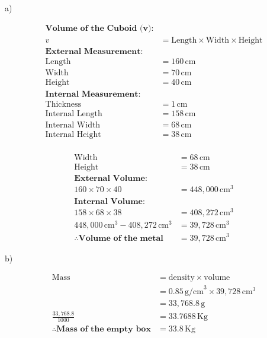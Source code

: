 \documentclass[
  a4paperpaper,
]{scrbook}
\begin{document}
\begin{tcolorbox}[enhanced jigsaw, left=2mm, colframe=quarto-callout-caution-color-frame, toptitle=1mm, opacitybacktitle=0.6, rightrule=.15mm, colbacktitle=quarto-callout-caution-color!10!white, colback=white, arc=.35mm, breakable, leftrule=.75mm, bottomtitle=1mm, bottomrule=.15mm, title=\textcolor{quarto-callout-caution-color}{\faFire}\hspace{0.5em}{Solution}, titlerule=0mm, coltitle=black, toprule=.15mm, opacityback=0]

a)

$$
\begin{aligned}
\textbf{Volume of the Cuboid (v):} & \\
v &= \text{Length} \times \text{Width} \times \text{Height} \\
\textbf{External Measurement:} & \\
\text{Length} &= 160 \, \text{cm} \\
\text{Width} &= 70 \, \text{cm} \\
\text{Height} &= 40 \, \text{cm} \\
\textbf{Internal Measurement:} & \\
\text{Thickness} &= 1 \, \text{cm} \\
\text{Internal Length} &= 158 \, \text{cm} \\
\text{Internal Width} &= 68 \, \text{cm} \\
\text{Internal Height} &= 38 \, \text{cm} \\ 
\end{aligned}
$$

\[
\begin{aligned}
\text{Width} &= 68 \, \text{cm} \\
\text{Height} &= 38 \, \text{cm} \\ 
\textbf{External Volume:} \\
160 \times 70 \times 40 &= 448,000 \, \text{cm}^3 \\ 
\textbf{Internal Volume:} \\
158 \times 68 \times 38 &= 408,272 \, \text{cm}^3 \\ 
448,000 \, \text{cm}^3 - 408,272 \, \text{cm}^3 &= 39,728 \, \text{cm}^3 \\ 
\therefore \textbf{Volume of the metal} &= 39,728 \, \text{cm}^3 
\end{aligned}
\]

b)

\[
\begin{aligned}
\text{Mass} &= \text{density} \times \text{volume} \\
&= 0.85 \, \text{g/cm}^3 \times 39,728 \, \text{cm}^3 \\ 
&= 33,768.8 \, \text{g} \\ 
\frac{33,768.8}{1000} &= 33.7688 \, \text{Kg} \\ 
\therefore \textbf{Mass of the empty box} &= 33.8 \, \text{Kg}
\end{aligned}
\]


\end{tcolorbox}
\end{document}
